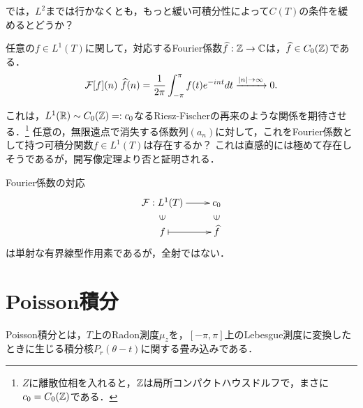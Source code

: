 \documentclass[uplatex,dvipdfmx]{jsreport}
\begin{document}
\begin{tcolorbox}[colframe=ForestGreen, colback=ForestGreen!10!white,breakable,colbacktitle=ForestGreen!40!white,coltitle=black,fonttitle=\bfseries\sffamily,
title=]
    では，$L^2$までは行かなくとも，もっと緩い可積分性によって$C(T)$の条件を緩めるとどうか？
\end{tcolorbox}

\begin{theorem}
    任意の$f\in L^1(T)$に関して，対応するFourier係数$\widehat{f}:\mathbb{Z}\to\mathbb{C}$は，$\widehat{f}\in C_0(\mathbb{Z})$である．
    \[\mathcal{F}[f](n)~\widehat{f}(n)=\frac{1}{2\pi}\int^\pi_{-\pi}f(t)e^{-int}dt\xrightarrow{\lvert n\rvert\to\infty}0.\]
\end{theorem}

これは，$L^1(\mathbb{R})\sim C_0(\mathbb{Z})=:c_0$なるRiesz-Fischerの再来のような関係を期待させる．\footnote{$Z$に離散位相を入れると，$\mathbb{Z}$は局所コンパクトハウスドルフで，まさに$c_0=C_0(\mathbb{Z})$である．}
任意の，無限遠点で消失する係数列$(a_n)$に対して，これをFourier係数として持つ可積分関数$f\in L^1(T)$は存在するか？
これは直感的には極めて存在しそうであるが，開写像定理より否と証明される．

\begin{theorem}
    Fourier係数の対応
    \[\xymatrix@R-2pc{
        \F:L^1(T)\ar[r]&c_0\\
        \rotatebox[origin=c]{90}{$\in$}&\rotatebox[origin=c]{90}{$\in$}\\
        f\ar@{|->}[r]&\wh{f}
    }\]
    は単射な有界線型作用素であるが，全射ではない．
\end{theorem}

\section{Poisson積分}

\begin{tcolorbox}[colframe=ForestGreen, colback=ForestGreen!10!white,breakable,colbacktitle=ForestGreen!40!white,coltitle=black,fonttitle=\bfseries\sffamily,
title=]
    Poisson積分とは，$T$上のRadon測度$\mu_z$を，$[-\pi,\pi]$上のLebesgue測度に変換したときに生じる積分核$P_r(\theta-t)$に関する畳み込みである．
    
\end{tcolorbox}
\end{document}

